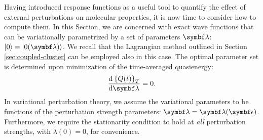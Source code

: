 Having introduced response functions as a useful tool to quantify the
effect of external perturbations on molecular properties, it is now time
to consider how to compute them.
In this Section, we are concerned with exact wave functions that can
be variationally parametrized by a set of parameters
$\vect{\lambda}$: $\ket{0}=\ket{0(\vect{\lambda})}$.
We recall that the Lagrangian method outlined in Section
\ref{sec:coupled-cluster} can be employed also in this
case.\autocite{Christiansen1998-pe, Helgaker2012-cz, Pawlowski2015-sq}
The optimal parameter set is determined upon minimization of the
time-averaged quasienergy:
\begin{equation}\label{eq:var-cond}
 \deriv{\aveQ}{\vect{\lambda}} = 0.
\end{equation}
In variational perturbation theory,\autocite{Helgaker1992-ph,
Saue2002-ns} we assume the variational parameters to be functions of the
perturbation strength parameters: $\vect{\lambda} =
\vect{\lambda}(\vect{\epsilon})$.
Furthermore, we require the stationarity condition to hold at \emph{all}
perturbation strengths, with $\lambda(0) = 0$, for convenience.

